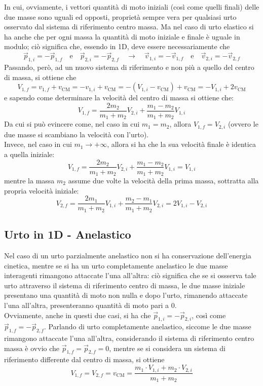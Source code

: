 \documentclass[a4paper]{extarticle}
\begin{document}
\noindent
In cui, ovviamente, i vettori quantità di moto iniziali (così come quelli finali) delle due masse sono uguali ed opposti, proprietà sempre vera per qualsiasi urto osservato dal sistema di riferimento centro massa. Ma nel caso di urto elastico si ha anche che per ogni massa la quantità di moto iniziale e finale è uguale in modulo; ciò significa che, essendo in 1D, deve essere necessariamente che
\[\vec p_{1,i} = - \vec p_{1,f} \hspace{1em} \text{e} \hspace{1em} \vec p_{2,i} = - \vec p_{2,f} \hspace{1em} \longrightarrow \hspace{1em} \vec v_{1,i} = - \vec v_{1,f} \hspace{1em} \text{e} \hspace{1em} \vec v_{2,i} = - \vec v_{2,f}\]
Passando, però, ad un nuovo sistema di riferimento e non più a quello del centro di massa, si ottiene che
\[V_{1,f} = v_{1,f} + v_{\text{CM}} = -v_{1,i} + v_{\text{CM}} = - \left(V_{1,i} - v_{\text{CM}}\right) + v_{\text{CM}} = -V_{1,i} + 2 v_{\text{CM}}\]
e sapendo come determinare la velocità del centro di massa si ottiene che:
\[\boxed{V_{1,f} = \frac{2 m_2}{m_1 + m_2} V_{2,i} + \frac{m_1-m_2}{m_1+m_2} V_{1,i}}\]
Da cui si può evincere come, nel caso in cui $m_1=m_2$, allora $V_{1,f}=V_{2,i}$ (ovvero le due masse si scambiano la velocità con l'urto).\\
Invece, nel caso in cui $m_1 \to +\infty$, allora si ha che la sua velocità finale è identica a quella iniziale:
\[V_{1,f} = \frac{2 m_2}{m_1 + m_2} V_{2,i} + \frac{m_1-m_2}{m_1+m_2} V_{1,i} = V_{1,i}\]
mentre la massa $m_2$ assume due volte la velocità della prima massa, sottratta alla propria velocità iniziale:
\[V_{2,f} = \frac{2 m_1}{m_1 + m_2} V_{1,i} + \frac{m_2-m_1}{m_1+m_2} V_{2,i} = 2 V_{1,i} - V_{2,i}\]

\newpage
\subsection{Urto in 1D - Anelastico}
Nel caso di un urto parzialmente anelastico non si ha conservazione dell'energia cinetica, mentre se si ha un urto completamente anelastico le due masse interagenti rimangono attaccate l'una all'altra: ciò significa che se si ossserva tale urto attraverso il sistema di riferimento centro di massa, le due masse iniziale presentano una quantità di moto non nulla e dopo l'urto, rimanendo attaccate l'una all'altra, presenteranno quantità di moto pari a $0$.\\
Ovviamente, anche in questi due casi, si ha che $\vec p_{1,i} = -\vec p_{2,i}$, così come $\vec p_{1,f} = - \vec p_{2,f}$. Parlando di urto completamente anelastico, siccome le due masse rimangono attaccate l'una all'altra, considerando il sistema di riferimento centro massa è ovvio che $\vec p_{1,f} = \vec p_{2,f} = 0$, mentre se si considera un sistema di riferimento differente dal centro di massa, si ottiene
\[\boxed{V_{1,f} = V_{2,f} = v_{\text{CM}} = \frac{m_1 \cdot V_{1,i} + m_2 \cdot V_{2,i}}{m_1 + m_2}}\]
\end{document}
